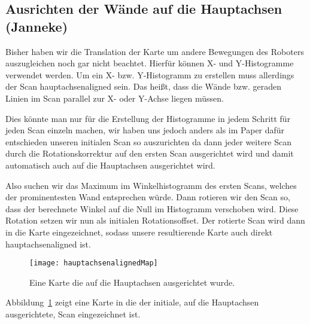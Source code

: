 \subsection{Ausrichten der Wände auf die Hauptachsen (Janneke)}

Bisher haben wir die Translation der Karte um andere Bewegungen des Roboters auszugleichen noch gar nicht beachtet. Hierfür können X- und Y-Histogramme verwendet werden. Um ein X- bzw. Y-Histogramm zu erstellen muss allerdings der Scan hauptachsenaligned sein. Das heißt, dass die Wände bzw. geraden Linien im Scan parallel zur X- oder Y-Achse liegen müssen.

Dies könnte man nur für die Erstellung der Histogramme in jedem Schritt für jeden Scan einzeln machen, wir haben uns jedoch anders als im Paper dafür entschieden unseren initialen Scan so auszurichten da dann jeder weitere Scan durch die Rotationskorrektur auf den ersten Scan ausgerichtet wird und damit automatisch auch auf die Hauptachsen ausgerichtet wird.

Also suchen wir das Maximum im Winkelhistogramm des ersten Scans, welches der prominentesten Wand entsprechen würde. Dann rotieren wir den Scan so, dass der berechnete Winkel auf die Null im Histogramm verschoben wird. Diese Rotation setzen wir nun als initialen Rotationsoffset. Der rotierte Scan wird dann in die Karte eingezeichnet, sodass unsere resultierende Karte auch direkt hauptachsenaligned ist.

\begin{figure}
	\centering
	\texttt{[image: hauptachsenalignedMap]}
	\caption{Eine Karte die auf die Hauptachsen ausgerichtet wurde.}
	\label{fig:Hauptachsenaligned}
\end{figure}

Abbildung~\ref{fig:Hauptachsenaligned} zeigt eine Karte in die der initiale, auf die Hauptachsen ausgerichtete, Scan eingezeichnet ist.